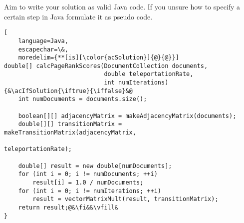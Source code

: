 \documentclass[exam, sectionseven, solution]{acAssignment}
\begin{document}
Aim to write your solution as valid Java code.
If you unsure how to specify a certain step in Java formulate it as pseudo code.

\clearpage
\begin{lstlisting}[
    language=Java,
    escapechar=\&,
    moredelim={**[is][\color{acSolution}]{@}{@}}]
double[] calcPageRankScores(DocumentCollection documents,
                            double teleportationRate,
                            int numIterations) {&\acIfSolution{\iftrue}{\iffalse}&@
    int numDocuments = documents.size();
    
    boolean[][] adjacencyMatrix = makeAdjacencyMatrix(documents);
    double[][] transitionMatrix = makeTransitionMatrix(adjacencyMatrix,
                                                       teleportationRate);
    
    double[] result = new double[numDocuments];
    for (int i = 0; i != numDocuments; ++i)
        result[i] = 1.0 / numDocuments;
    for (int i = 0; i != numIterations; ++i)
        result = vectorMatrixMult(result, transitionMatrix);
    return result;@&\fi&&\vfill&
}
\end{lstlisting}


\end{document}

